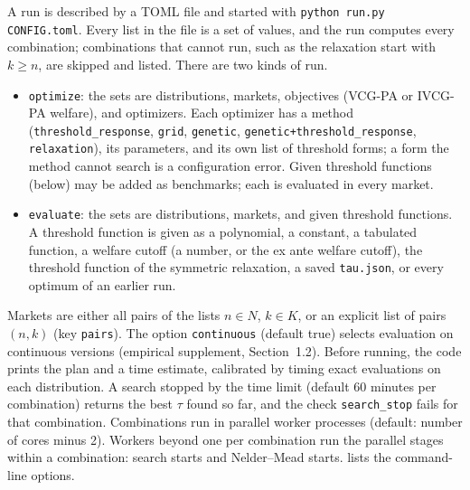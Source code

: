 \documentclass[11pt]{article}
\newcommand{\code}[1]{\texttt{#1}}
\begin{document}
A run is described by a TOML file and started with \code{python run.py CONFIG.toml}. Every list in the file is a set of values, and the run computes every combination; combinations that cannot run, such as the relaxation start with $k\geq n$, are skipped and listed. There are two kinds of run.
\begin{itemize}
    \item \code{optimize}: the sets are distributions, markets, objectives (VCG-PA or IVCG-PA welfare), and optimizers. Each optimizer has a method (\code{threshold\_response}, \code{grid}, \code{genetic}, \code{genetic+threshold\_response}, \code{relaxation}), its parameters, and its own list of threshold forms; a form the method cannot search is a configuration error. Given threshold functions (below) may be added as benchmarks; each is evaluated in every market.
    \item \code{evaluate}: the sets are distributions, markets, and given threshold functions. A threshold function is given as a polynomial, a constant, a tabulated function, a welfare cutoff (a number, or the ex ante welfare cutoff), the threshold function of the symmetric relaxation, a saved \code{tau.json}, or every optimum of an earlier run.
\end{itemize}
Markets are either all pairs of the lists $n\in N$, $k\in K$, or an explicit list of pairs $(n,k)$ (key \code{pairs}).
The option \code{continuous} (default true) selects evaluation on continuous versions (empirical supplement, Section~1.2). Before running, the code prints the plan and a time estimate, calibrated by timing exact evaluations on each distribution. A search stopped by the time limit (default 60 minutes per combination) returns the best $\tau$ found so far, and the check \code{search\_stop} fails for that combination. Combinations run in parallel worker processes (default: number of cores minus 2). Workers beyond one per combination run the parallel stages within a combination: search starts and Nelder--Mead starts.  lists the command-line options.
\end{document}
